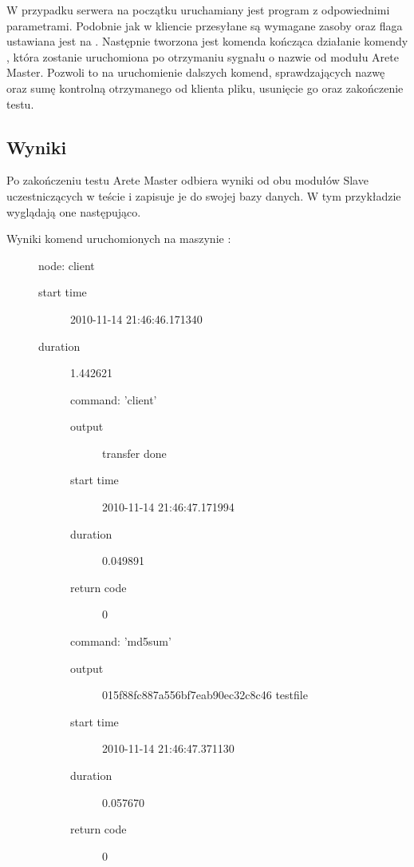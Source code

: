 \documentclass[00-praca-magisterska.tex]{subfiles}
\begin{document}
W przypadku serwera na początku uruchamiany jest program  z
odpowiednimi parametrami. Podobnie jak w kliencie przesyłane są wymagane zasoby
oraz flaga  ustawiana jest na . Następnie
tworzona jest komenda kończąca działanie komendy , która zostanie
uruchomiona po otrzymaniu sygnału o nazwie  od modułu Arete
Master. Pozwoli to na uruchomienie dalszych komend, sprawdzających nazwę oraz
sumę kontrolną otrzymanego od klienta pliku, usunięcie go oraz zakończenie
testu.

\subsection{Wyniki}

Po zakończeniu testu Arete Master odbiera wyniki od obu modułów Slave
uczestniczących w teście i zapisuje je do swojej bazy danych. W tym przykładzie
wyglądają one następująco.

Wyniki komend uruchomionych na maszynie :
\begin{description}
\item[]
  node: client
  \begin{description}
  \item[start time] 2010-11-14 21:46:46.171340
  \item[duration] 1.442621
  \item[]
    command: 'client'
    \begin{description}
      \item[output] transfer done
      \item[start time] 2010-11-14 21:46:47.171994
      \item[duration] 0.049891
      \item[return code] 0
    \end{description}
  \item[]
    command: 'md5sum'
    \begin{description}
      \item[output] 015f88fc887a556bf7eab90ec32c8c46  testfile
      \item[start time] 2010-11-14 21:46:47.371130
      \item[duration] 0.057670
      \item[return code] 0
    \end{description}
  \end{description}
\end{description}
\end{document}
